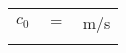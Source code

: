 \begin{longtable}{ p{}  p{}  p{}} 
$ c_0 $ & $=$ & \unit[299729458]{m/s} \\
\addlinespace[15pt]
\end{longtable}